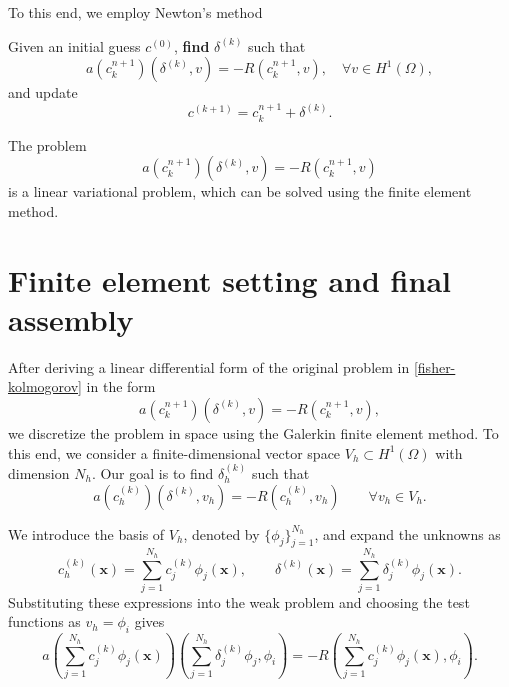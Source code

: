 \documentclass[12pt, a4paper, twoside, openright]{report}
\begin{document}
To this end, we employ Newton's method


\begin{algorithmic}
  \State Given an initial guess $c^{(0)}$,
  \State \textbf{find} $\delta^{(k)}$ such that
  \[
    a(c_k^{n+1})(\delta^{(k)}, v) = -R(c_k^{n+1}, v), \quad \forall v \in H^1(\Omega),
  \]
  \State and update
  \[
    c^{(k+1)} = c_k^{n+1} + \delta^{(k)}.
  \]
  \EndWhile
\end{algorithmic}

The problem
\[
  a(c_k^{n+1})(\delta^{(k)}, v) = -R(c_k^{n+1}, v)
\]
is a linear variational problem, which can be solved using the finite element method.


\section{Finite element setting and final assembly}

After deriving a linear differential form of the original problem in \autoref{fisher-kolmogorov} in the form
\[
  a(c_k^{n+1})(\delta^{(k)}, v) = -R(c_k^{n+1}, v),
\]
we discretize the problem in space using the Galerkin finite element method.
To this end, we consider a finite-dimensional vector space \(V_h \subset H^1(\Omega)\) with dimension \(N_h\).
Our goal is to find \(\delta_h^{(k)}\) such that
\[
  a(c_h^{(k)})(\delta^{(k)}, v_h) = -R(c_h^{(k)}, v_h) \qquad \forall v_h \in V_h.
\]

We introduce the basis of \(V_h\), denoted by \(\{\phi_j\}_{j=1}^{N_h}\), and expand the unknowns as
\[
  c_h^{(k)}(\mathbf{x}) = \sum_{j=1}^{N_h} c_j^{(k)} \phi_j(\mathbf{x}),
  \qquad
  \delta^{(k)}(\mathbf{x}) = \sum_{j=1}^{N_h} \delta_j^{(k)} \phi_j(\mathbf{x}).
\]
Substituting these expressions into the weak problem and choosing the test functions as \(v_h=\phi_i\) gives
\begin{equation}
  a \!\left( \sum_{j=1}^{N_h} c_j^{(k)} \phi_j(\mathbf{x}) \right)\!\!\left(\sum_{j=1}^{N_h} \delta_j^{(k)} \phi_j, \phi_i \right)
  = -R \!\left( \sum_{j=1}^{N_h} c_j^{(k)} \phi_j(\mathbf{x}), \phi_i \right).
\end{equation}
\end{document}
